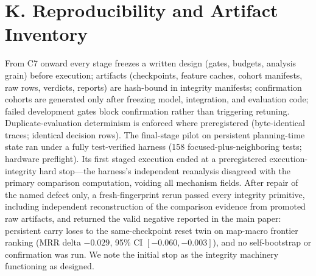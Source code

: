\documentclass[letterpaper]{article} %
\newcommand{\stage}[1]{\textsc{#1}}
\begin{document}
\section{K. Reproducibility and Artifact Inventory}

From \stage{C7} onward every stage freezes a written design (gates, budgets, analysis grain) before execution; artifacts (checkpoints, feature caches, cohort manifests, raw rows, verdicts, reports) are hash-bound in integrity manifests; confirmation cohorts are generated only after freezing model, integration, and evaluation code; failed development gates block confirmation rather than triggering retuning. Duplicate-evaluation determinism is enforced where preregistered (byte-identical traces; identical decision rows). The final-stage pilot on persistent planning-time state ran under a fully test-verified harness (158 focused-plus-neighboring tests; hardware preflight). Its first staged execution ended at a preregistered execution-integrity hard stop---the harness's independent reanalysis disagreed with the primary comparison computation, voiding all mechanism fields. After repair of the named defect only, a fresh-fingerprint rerun passed every integrity primitive, including independent reconstruction of the comparison evidence from promoted raw artifacts, and returned the valid negative reported in the main paper: persistent carry loses to the same-checkpoint reset twin on map-macro frontier ranking (MRR delta $-0.029$, 95\% CI $[-0.060,-0.003]$), and no self-bootstrap or confirmation was run. We note the initial stop as the integrity machinery functioning as designed.
\end{document}
